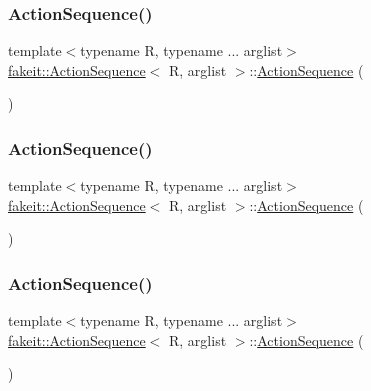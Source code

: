 \subsubsection{\texorpdfstring{ActionSequence()}{ActionSequence()}\hspace{0.1cm}{\footnotesize\ttfamily [1/9]}}
{\footnotesize\ttfamily template$<$typename R, typename ... arglist$>$ \\
\mbox{\hyperlink{structfakeit_1_1ActionSequence}{fakeit\+::\+Action\+Sequence}}$<$ R, arglist $>$\+::\mbox{\hyperlink{structfakeit_1_1ActionSequence}{Action\+Sequence}} (\begin{DoxyParamCaption}{ }\end{DoxyParamCaption})\hspace{0.3cm}{\ttfamily [inline]}}

\mbox{\label{structfakeit_1_1ActionSequence_a2c9b1deefcce41af21f9ad4b7b431c7d}} 
\subsubsection{\texorpdfstring{ActionSequence()}{ActionSequence()}\hspace{0.1cm}{\footnotesize\ttfamily [2/9]}}
{\footnotesize\ttfamily template$<$typename R, typename ... arglist$>$ \\
\mbox{\hyperlink{structfakeit_1_1ActionSequence}{fakeit\+::\+Action\+Sequence}}$<$ R, arglist $>$\+::\mbox{\hyperlink{structfakeit_1_1ActionSequence}{Action\+Sequence}} (\begin{DoxyParamCaption}{ }\end{DoxyParamCaption})\hspace{0.3cm}{\ttfamily [inline]}}

\mbox{\label{structfakeit_1_1ActionSequence_a2c9b1deefcce41af21f9ad4b7b431c7d}} 
\subsubsection{\texorpdfstring{ActionSequence()}{ActionSequence()}\hspace{0.1cm}{\footnotesize\ttfamily [3/9]}}
{\footnotesize\ttfamily template$<$typename R, typename ... arglist$>$ \\
\mbox{\hyperlink{structfakeit_1_1ActionSequence}{fakeit\+::\+Action\+Sequence}}$<$ R, arglist $>$\+::\mbox{\hyperlink{structfakeit_1_1ActionSequence}{Action\+Sequence}} (\begin{DoxyParamCaption}{ }\end{DoxyParamCaption})\hspace{0.3cm}{\ttfamily [inline]}}

